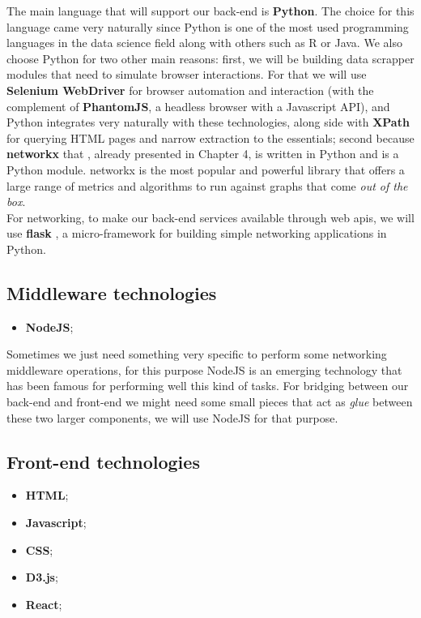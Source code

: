 The main language that will support our back-end is \textbf{Python}. The choice for this language came very naturally since Python is one of the most used programming languages in the data science field along with others such as R or Java. We also choose Python for two other main reasons: first, we will be building data scrapper modules that need to simulate browser interactions.
 For that we will use \textbf{Selenium WebDriver} \citep{documentation2013selenium} for browser automation and interaction (with the complement of \textbf{PhantomJS}\citep{hidayat2013phantomjs}, a headless browser with a Javascript API), and Python integrates very naturally with these technologies, along side with \textbf{XPath} \citep{clark1999xml} for querying HTML pages and narrow extraction to the essentials; second because \textbf{networkx} that \citep{hagberg2013networkx}, already presented in Chapter 4, is written in Python and is a Python module. networkx is the most popular and powerful library that offers a large range of metrics and algorithms to run against graphs that come \textit{out of the box}.\\
\indent For networking, to make our back-end services available through web \glspl{api}, we will use \textbf{flask} \citep{ronacher2015flask}, a micro-framework for building simple networking applications in Python.

\subsection{Middleware technologies}
\begin{itemize}
    \item \textbf{NodeJS};
\end{itemize}

Sometimes we just need something very specific to perform some networking middleware operations, for this purpose NodeJS \citep{nodejs} is an emerging technology
that has been famous for performing well this kind of tasks. For bridging between our back-end and front-end we might need some small pieces that act
as \textit{glue} between these two larger components, we will use NodeJS for that purpose.

\subsection{Front-end technologies}
\begin{itemize}
    \item \textbf{HTML};
    \item \textbf{Javascript};
    \item \textbf{CSS};
    \item \textbf{D3.js};
    \item \textbf{React};
\end{itemize}


